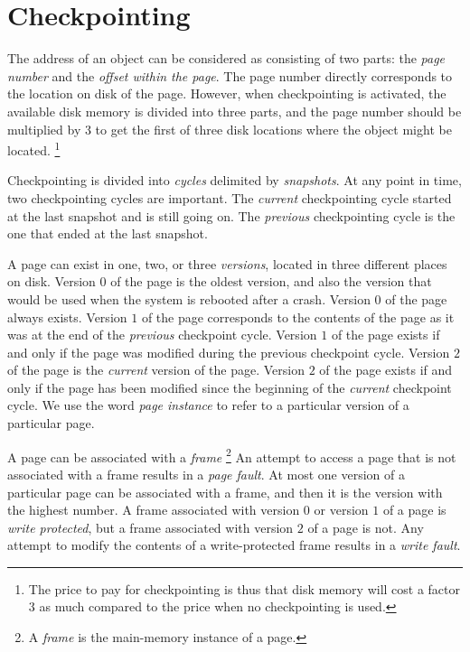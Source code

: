 \chapter{Checkpointing}
\label{chap-checkpointing}

The address of an object can be considered as consisting of two parts:
the \emph{page number} and the \emph{offset within the page}.  The
page number directly corresponds to the location on disk of the page.
However, when checkpointing is activated, the available disk memory is
divided into three parts, and the page number should be multiplied by
3 to get the first of three disk locations where the object might be
located.%
\footnote{The price to pay for checkpointing is thus that disk memory
  will cost a factor 3 as much compared to the price when no
  checkpointing is used.}

Checkpointing is divided into \emph{cycles} delimited by
\emph{snapshots}.  At any point in time, two checkpointing cycles are
important.  The \emph{current} checkpointing cycle started at the
last snapshot and is still going on.  The \emph{previous}
checkpointing cycle is the one that ended at the last snapshot. 

A page can exist in one, two, or three \emph{versions}, located in
three different places on disk.  Version $0$ of the page is the oldest
version, and also the version that would be used when the system is
rebooted after a crash.  Version $0$ of the page always exists.
Version $1$ of the page corresponds to the contents of the page as it
was at the end of the \emph{previous} checkpoint cycle.  Version $1$
of the page exists if and only if the page was modified during the
previous checkpoint cycle.  Version $2$ of the page is the
\emph{current} version of the page.  Version $2$ of the page exists if
and only if the page has been modified since the beginning of the
\emph{current} checkpoint cycle.  We use the word \emph{page instance}
to refer to a particular version of a particular page. 

A page can be associated with a \emph{frame}%
\footnote{A \emph{frame} is the main-memory instance of a page.}  An
attempt to access a page that is not associated with a frame results
in a \emph{page fault}.  At most one version of a particular page can
be associated with a frame, and then it is the version with the
highest number.  A frame associated with version $0$ or version $1$ of
a page is \emph{write protected}, but a frame associated with version
$2$ of a page is not.  Any attempt to modify the contents of a
write-protected frame results in a \emph{write fault}.

